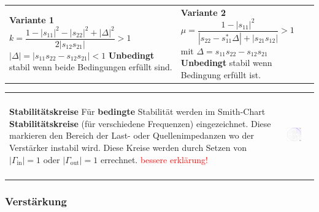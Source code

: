\begin{tabular}{lll}
\parbox{9cm}{
    \textbf{Variante 1} \\
    $  k=\dfrac{1-|s_{11}|^2-|s_{22}|^2+|\Delta|^2}{2|s_{12}s_{21}|} > 1 $\\
    $  |\Delta|=|s_{11}s_{22}-s_{12}s_{21}| <1 $ \\
    \textbf{Unbedingt} stabil wenn beide Bedingungen erfüllt sind. \\
    }
& \parbox{9cm}{
    \textbf{Variante 2} \\
    $  \mu =\dfrac{1-|s_{11}|^2}%
          {|s_{22}-s_{11}^*\Delta|+|s_{21}s_{12}|} > 1 $\\
  mit $\Delta =s_{11}s_{22}-s_{12}s_{21} $ \\
    \textbf{Unbedingt} stabil wenn Bedingung erfüllt ist. \\
} \\
\end{tabular}


\begin{tabular}{lll}
\parbox{9cm}{
   \textbf{Stabilitätskreise} \\    
        Für \textbf{bedingte} Stabilität werden im Smith-Chart
        \textbf{Stabilitätskreise} (für verschiedene Frequenzen)
        eingezeichnet. Diese markieren den Bereich der Last- oder
        Quellenimpedanzen wo der Verstärker instabil wird. \\
        Diese Kreise werden durch Setzen von $|\Gamma_{\text{in}}|=1$
        oder $|\Gamma_{\text{out}}|=1$ errechnet.
        \textcolor{red}{bessere erklärung!}        
        }
& \parbox{9cm}{
        \includegraphics[height=3.5cm]{./bilder/components_amplifier_stability.png}
        }\\
\end{tabular}

\subsubsection{Verstärkung }

